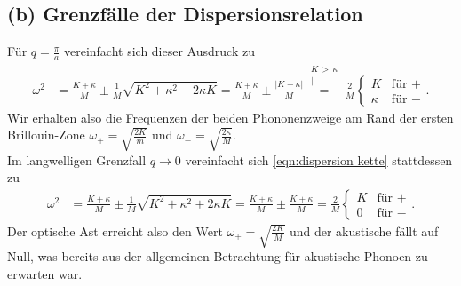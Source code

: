 \documentclass[english, parskip=full]{scrartcl}
\newcommand{\kom}{}
\newcommand{\tecxt}{}
\begin{document}
\subsection*{(b) Grenzfälle der Dispersionsrelation}
Für $q=\frac{\pi}{a}$ vereinfacht sich dieser Ausdruck zu
\begin{align}
\omega^2 &= \frac{K+\kappa}{M} \pm \frac{1}{M} \sqrt{K^2 + \kappa^2 - 2\kappa K} = \frac{K+\kappa}{M} \pm \frac{|K-\kappa|}{M} \kom\overset{\substack{{K\,>\,\kappa} \\ |}}{=} \frac{2}{M} \begin{cases} K &\tecxt\text{für } + \\ \kappa &\tecxt\text{für } - \end{cases}.
\end{align}
Wir erhalten also die Frequenzen der beiden Phononenzweige am Rand der ersten Brillouin-Zone $\omega_+ = \sqrt{\frac{2K}{m}}$ und $\omega_- = \sqrt{\frac{2\kappa}{M}}$.
\\
Im langwelligen Grenzfall $q\rightarrow 0$ vereinfacht sich \autoref{eqn:dispersion kette} stattdessen zu
\begin{align}
\omega^2 &= \frac{K+\kappa}{M} \pm \frac{1}{M} \sqrt{K^2 + \kappa^2 + 2\kappa K} = \frac{K+\kappa}{M} \pm \frac{K+\kappa}{M} = \frac{2}{M} \begin{cases} K &\tecxt\text{für } + \\ 0 &\tecxt\text{für } - \end{cases}.
\end{align}
Der optische Ast erreicht also den Wert $\omega_+ = \sqrt{\frac{2K}{M}}$ und der akustische fällt auf Null, was bereits aus der allgemeinen Betrachtung für akustische Phonoen zu erwarten war.
\end{document}
